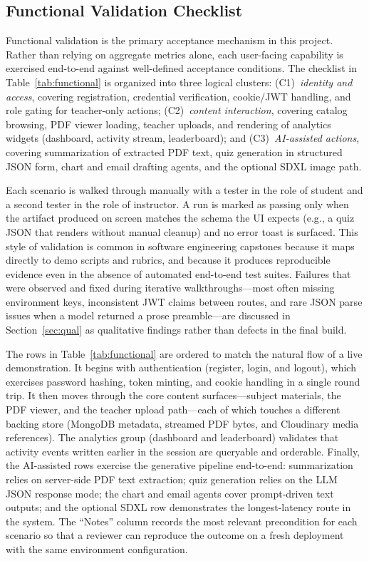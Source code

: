 \documentclass[conference]{IEEEtran}
\begin{document}
\subsection{Functional Validation Checklist}

Functional validation is the primary acceptance mechanism in this project. Rather than relying on aggregate metrics alone, each user-facing capability is exercised end-to-end against well-defined acceptance conditions. The checklist in Table~\ref{tab:functional} is organized into three logical clusters: (C1)~\emph{identity and access}, covering registration, credential verification, cookie/JWT handling, and role gating for teacher-only actions; (C2)~\emph{content interaction}, covering catalog browsing, PDF viewer loading, teacher uploads, and rendering of analytics widgets (dashboard, activity stream, leaderboard); and (C3)~\emph{AI-assisted actions}, covering summarization of extracted PDF text, quiz generation in structured JSON form, chart and email drafting agents, and the optional SDXL image path.

Each scenario is walked through manually with a tester in the role of student and a second tester in the role of instructor. A run is marked as passing only when the artifact produced on screen matches the schema the UI expects (e.g., a quiz JSON that renders without manual cleanup) and no error toast is surfaced. This style of validation is common in software engineering capstones because it maps directly to demo scripts and rubrics, and because it produces reproducible evidence even in the absence of automated end-to-end test suites. Failures that were observed and fixed during iterative walkthroughs---most often missing environment keys, inconsistent JWT claims between routes, and rare JSON parse issues when a model returned a prose preamble---are discussed in Section~\ref{sec:qual} as qualitative findings rather than defects in the final build.

The rows in Table~\ref{tab:functional} are ordered to match the natural flow of a live demonstration. It begins with authentication (register, login, and logout), which exercises password hashing, token minting, and cookie handling in a single round trip. It then moves through the core content surfaces---subject materials, the PDF viewer, and the teacher upload path---each of which touches a different backing store (MongoDB metadata, streamed PDF bytes, and Cloudinary media references). The analytics group (dashboard and leaderboard) validates that activity events written earlier in the session are queryable and orderable. Finally, the AI-assisted rows exercise the generative pipeline end-to-end: summarization relies on server-side PDF text extraction; quiz generation relies on the LLM JSON response mode; the chart and email agents cover prompt-driven text outputs; and the optional SDXL row demonstrates the longest-latency route in the system. The ``Notes'' column records the most relevant precondition for each scenario so that a reviewer can reproduce the outcome on a fresh deployment with the same environment configuration.
\end{document}
